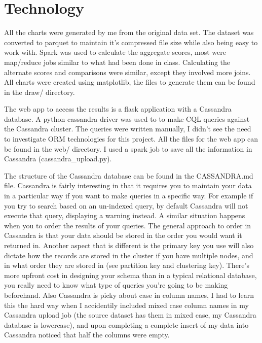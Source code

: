 \documentclass[a4paper,10pt]{article}
\begin{document}
\section*{Technology}
All the charts were generated by me from the original data set. The dataset was converted to parquet to maintain it's compressed file size while also being easy to work with. Spark was used to calculate the aggregate scores, most were map/reduce jobs similar to what had been done in class. Calculating the alternate scores and comparisons were similar, except they involved more joins. All charts were created using matplotlib, the files to generate them can be found in the draw/ directory.

The web app to access the results is a flask application with a Cassandra database. A python cassandra driver was used to to make CQL queries against the Cassandra cluster. The queries were written manually, I didn't see the need to investigate ORM technologies for this project. All the files for the web app can be found in the web/ directory. I used a spark job to save all the information in Cassandra (cassandra\_upload.py).

The structure of the Cassandra database can be found in the CASSANDRA.md file. Cassandra is fairly interesting in that it requires you to maintain your data in a particular way if you want to make queries in a specific way. For example if you try to search based on an un-indexed query, by default Cassandra will not execute that query, displaying a warning instead. A similar situation happens when you to order the results of your queries. The general approach to order in Cassandra is that your data should be stored in the order you would want it returned in. Another aspect that is different is the primary key you use will also dictate how the records are stored in the cluster if you have multiple nodes, and in what order they are stored in (see partition key and clustering key). There's more upfront cost in designing your schema than in a typical relational database, you really need to know what type of queries you're going to be making beforehand. Also Cassandra is picky about case in column names, I had to learn this the hard way when I accidentily included mixed case column names in my Cassandra upload job (the source dataset has them in mixed case, my Cassandra database is lowercase), and upon completing a complete insert of my data into Cassandra noticed that half the columns were empty.
\end{document}
